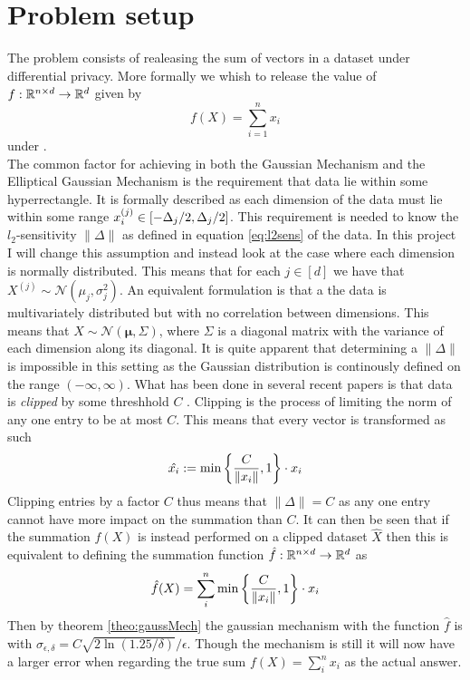 \documentclass[a4paper,12pt]{article}
\begin{document}
\section{Problem setup}
The problem consists of realeasing the sum of vectors 
in a dataset under differential privacy.
More formally we whish to release the value of 
$f:\mathbb{R}^{n \times d} \rightarrow  \mathbb{R}^d$ given by
\[ f(X) = \sum_{i = 1}^n x_i  \] 
under \edp. \\
The common factor for achieving \edp in both the Gaussian Mechanism
and the Elliptical Gaussian Mechanism is the requirement that 
data lie within some hyperrectangle. It is formally described as 
each dimension of the data must lie within some range 
$ x^{(j)}_i \in \left [-\Delta_j/2, \Delta_j/2 \right] $. 
This requirement is needed to know the $l_2$-sensitivity $\| \Delta \|$ 
as defined in equation \ref{eq:l2sens} of the data.
In this project I will change this assumption and instead 
look at the case where each dimension is normally distributed.
This means that for each 
$ j \in [d] $ we have that 
$X^{(j)} \sim \mathcal{N}(\mu_j, \sigma_j^2)$.
An equivalent formulation is that a the data is 
multivariately distributed but with no correlation between dimensions.
This means that $X \sim \mathcal{N}(\bm{\mu}, \Sigma ) $, 
where $\Sigma$ is a diagonal matrix with the variance of each 
dimension along its diagonal.
It is quite apparent that determining a $ \| \Delta \|$ is impossible 
in this setting as the Gaussian distribution is continously defined 
on the range $ (-\infty, \infty)$. What has been done in several 
recent papers is that data is \textit{clipped} by some threshhold 
$C$ \cite{Huang2021,coinpress}. 
Clipping is the process of limiting the norm of any one entry 
to be at most $C$. This means that every vector is transformed as such
\[
    \hat{x_i} := \min \left \{\frac{C}{\| x_i \|}, 1\right\} \cdot x_i
\]
Clipping entries by a factor $C$ thus means that $\| \Delta \| = C $ 
as any one entry cannot have more impact on the summation than $C$.
It can then be seen that if the summation $f(X)$ is instead 
performed on a clipped dataset $\hat{X}$ then this is equivalent to
defining the summation function $\hat{f}: \mathbb{R}^{n \times d} \rightarrow \mathbb{R}^d$ as
\[
    \hat{f}(X) = \sum_i^n \min \left \{ \frac{C}{\| x_i \|}, 1\right\} \cdot x_i
    \]
Then by theorem \ref{theo:gaussMech} the 
gaussian mechanism with the function $\hat{f}$ is \edp with
$\sigma_{\epsilon, \delta} = C \sqrt{2 \ln (1.25/\delta)}/\epsilon$.
Though the mechanism is still \edp it will now have 
a larger error when regarding the true sum
$f(X) = \sum_i^n x_i$ as the actual answer.



{}

\end{document}
